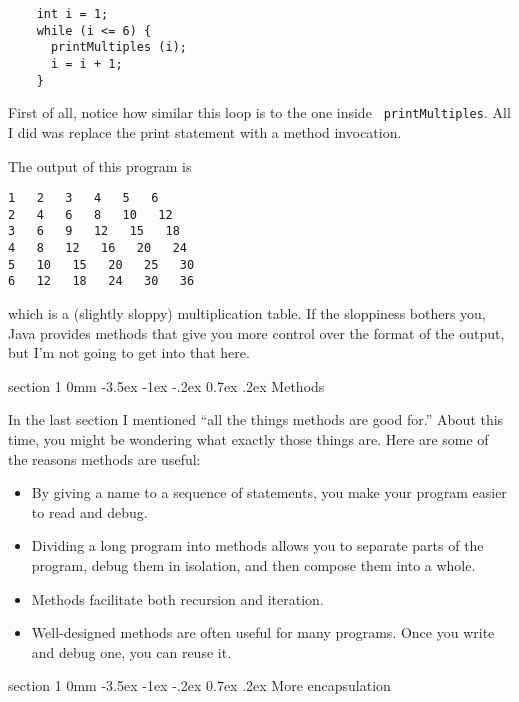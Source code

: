 \documentclass{book}
\makeatletter
\renewcommand{\section}{\@startsection 
    {section} {1} {0mm}%
    {-3.5ex \@plus -1ex \@minus -.2ex}%
    {0.7ex \@plus.2ex}%
    {\normalfont\Large\bfseries}}
\makeatother
\begin{document}
\begin{verbatim}
    int i = 1;
    while (i <= 6) {
      printMultiples (i);
      i = i + 1;
    }    
\end{verbatim}
%
First of all, notice how similar this loop is to the one inside {\tt
printMultiples}.  All I did was replace the print statement with a
method invocation.

The output of this program is

\begin{verbatim}
1   2   3   4   5   6   
2   4   6   8   10   12   
3   6   9   12   15   18   
4   8   12   16   20   24   
5   10   15   20   25   30   
6   12   18   24   30   36   
\end{verbatim}
%
which is a (slightly sloppy) multiplication table.  If the
sloppiness bothers you, Java provides methods that give you
more control over the format of the output, but I'm not
going to get into that here.

\section{Methods}

In the last section I mentioned ``all the things methods
are good for.''  About this time, you might be wondering
what exactly those things are.  Here are some of the reasons
methods are useful:

\begin{itemize}

\item By giving a name to a sequence of statements, you make
your program easier to read and debug.

\item Dividing a long program into methods allows you to
separate parts of the program, debug them in isolation, and
then compose them into a whole.

\item Methods facilitate both recursion and iteration.

\item Well-designed methods are often useful for many programs.
Once you write and debug one, you can reuse it.

\end{itemize}

\section{More encapsulation}
\end{document}
